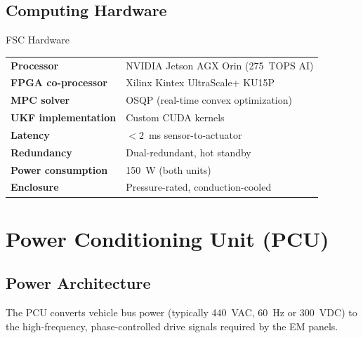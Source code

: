 \documentclass[11pt]{article}
\begin{document}
\subsection{Computing Hardware}

\begin{specbox}{FSC Hardware}
\begin{tabular}{@{}ll@{}}
\textbf{Processor} & NVIDIA Jetson AGX Orin (275~TOPS AI) \\
\textbf{FPGA co-processor} & Xilinx Kintex UltraScale+ KU15P \\
\textbf{MPC solver} & OSQP (real-time convex optimization) \\
\textbf{UKF implementation} & Custom CUDA kernels \\
\textbf{Latency} & $<2$~ms sensor-to-actuator \\
\textbf{Redundancy} & Dual-redundant, hot standby \\
\textbf{Power consumption} & 150~W (both units) \\
\textbf{Enclosure} & Pressure-rated, conduction-cooled \\
\end{tabular}
\end{specbox}

\section{Power Conditioning Unit (PCU)}
\label{sec:pcu}

\subsection{Power Architecture}

The PCU converts vehicle bus power (typically 440~VAC, 60~Hz or 300~VDC)
to the high-frequency, phase-controlled drive signals required by the EM
panels.
\end{document}
